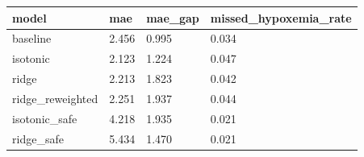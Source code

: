 \begin{tabular}{llll}
\toprule
model & mae & mae\_gap & missed\_hypoxemia\_rate \\
\midrule
baseline & 2.456 & 0.995 & 0.034 \\
isotonic & 2.123 & 1.224 & 0.047 \\
ridge & 2.213 & 1.823 & 0.042 \\
ridge_reweighted & 2.251 & 1.937 & 0.044 \\
isotonic_safe & 4.218 & 1.935 & 0.021 \\
ridge_safe & 5.434 & 1.470 & 0.021 \\
\bottomrule
\end{tabular}
